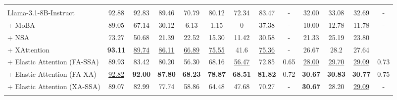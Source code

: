 \begin{table}[t]
{\begin{tabular}{l | c c c c c c | c | c | c c | c | c}
\arrayrulecolor{black}\midrule
\rowcolor{cyan!20}
\multicolumn{13}{c}{\textbf{Llama-3.1-8B-Instruct backbone model}} \\
\arrayrulecolor{black!20}\midrule
Llama-3.1-8B-Instruct  & 92.88 & 92.83 & 89.46 & 70.79 & 80.12 & 72.34 & 83.47 & - & 32.00 & 33.08 & 32.69 & - \\
+ MoBA & 89.05 & 67.14 & 30.12 & 6.13 & 1.15 & 0 & 37.38 & - & 10.00 & 12.78 & 11.78 & - \\
+ NSA & 73.27 & 50.68 & 21.39 & 22.52 & 15.30 & 11.42 & 30.58 & - & 21.33 & 25.19 & 23.80 \\
+ XAttention & \textbf{93.11} & \underline{89.74} & \underline{86.11} & \underline{66.89} & \underline{75.55} & 41.6 & \underline{75.36} & - & 26.67  & 28.2  & 27.64  \\
\arrayrulecolor{black!40}\midrule
+ Elastic Attention (FA-SSA) & 89.93 & 83.42 & 80.20 & 56.30 & 68.16 & \underline{56.47} & 72.85 & 0.65 & \underline{28.00} & \underline{29.70} & \underline{29.09} & 0.73\\
+ Elastic Attention (FA-XA) & \underline{92.82} & \textbf{92.00} & \textbf{87.80} & \textbf{68.23} & \textbf{78.87} & \textbf{68.51} & \textbf{81.82} & 0.72 & \textbf{30.67} & \textbf{30.83} & \textbf{30.77} & 0.75 \\
+ Elastic Attention (XA-SSA) & 89.07 & 82.99 & 77.74 & 58.86 & 64.48 & 47.68 & 70.27 & - & \textbf{30.67} & 28.20 & \underline{29.09} &  -\\

\arrayrulecolor{black}\bottomrule
\end{tabular}
}
\label{tab:ruler_lb2_result_appendix}
\end{table}